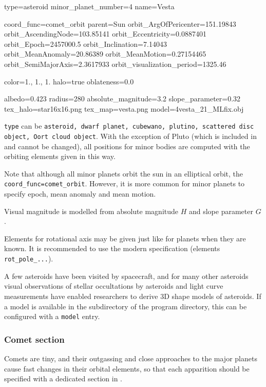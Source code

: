 \begin{configfile}
[4vesta]
type=asteroid  
minor_planet_number=4
name=Vesta

coord_func=comet_orbit
parent=Sun
orbit_ArgOfPericenter=151.19843
orbit_AscendingNode=103.85141
orbit_Eccentricity=0.0887401
orbit_Epoch=2457000.5
orbit_Inclination=7.14043
orbit_MeanAnomaly=20.86389
orbit_MeanMotion=0.27154465
orbit_SemiMajorAxis=2.3617933
orbit_visualization_period=1325.46

color=1., 1., 1.
halo=true
oblateness=0.0

albedo=0.423
radius=280
absolute_magnitude=3.2
slope_parameter=0.32
tex_halo=star16x16.png
tex_map=vesta.png
model=4vesta_21_MLfix.obj
\end{configfile}

\texttt{type} can be \texttt{asteroid, dwarf planet, cubewano,
  plutino, scattered disc object, Oort cloud object}. With the
exception of Pluto (which is included in  and cannot be changed), 
all positions for minor bodies are computed with
the orbiting elements given in this way. 

Note that although all minor planets orbit the sun in an
elliptical orbit, the \texttt{coord\_func=comet\_orbit}. However, it
is more common for minor planets to specify epoch, mean anomaly and
mean motion.

Visual magnitude is modelled from absolute magnitude $H$ and slope parameter $G$.

Elements for rotational axis may be given just like for planets when
they are known. It is recommended to use the modern specification
(elements \texttt{rot\_pole\_...}).

A few asteroids have been visited by spacecraft, 
and for many other asteroids visual observations of stellar occultations 
by asteroids and light curve measurements have enabled researchers to derive 
3D shape models of asteroids. If a model is available in the  
subdirectory of the program directory, this can be configured with a \texttt{model} entry.

\subsubsection{Comet section}
\label{sec:ssystem.ini:Comet}

Comets are tiny, and their outgassing and close approaches to the
major planets cause fast changes in their orbital elements, so that
each apparition should be specified with a dedicated section in
. 

